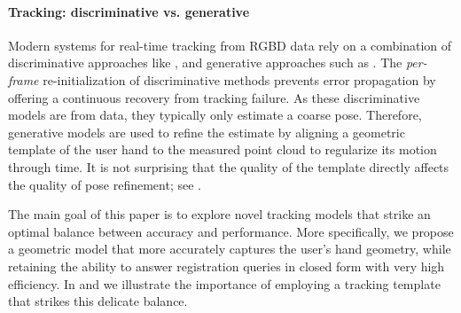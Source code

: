 \paragraph{Tracking: discriminative vs. generative}
Modern systems for real-time tracking from RGBD data  \cite{sridhar2015fast,sharp2015accurate} rely on a combination of discriminative approaches like \cite{keskin2012hand}, and generative approaches such as \cite{oiko2011hand}. The \emph{per-frame} re-initialization of discriminative methods prevents error propagation by offering a continuous recovery from tracking failure. As these discriminative models are  from data, they typically only estimate a coarse pose. Therefore, generative models are used to refine the estimate by aligning a geometric template of the user hand to the measured point cloud  to regularize its motion through time. It is not surprising that the quality of the template directly affects the quality of pose refinement; see . 



The main goal of this paper is to explore novel tracking models that strike an optimal balance between accuracy and performance.
% 
% 
More specifically, we propose a geometric model that more accurately captures the user's hand geometry, while retaining the ability to answer registration queries in closed form with very high efficiency. In  and 
\VideoHTrack{} we illustrate the importance of employing a tracking template that strikes this delicate balance.


